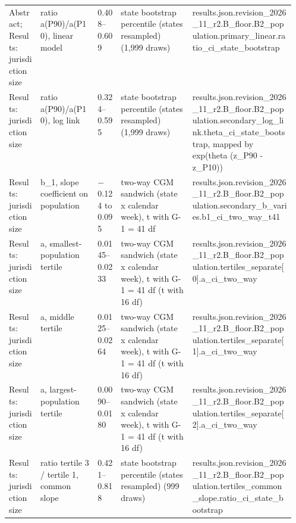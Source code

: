 \begin{table}[!tbp]
\begin{tabularx}{\linewidth}{@{}p{0.11\linewidth}p{0.2\linewidth}lp{0.25\linewidth}X@{}}
Abstract; Results: jurisdiction size & ratio a(P90)/a(P10), linear model & 0.408--0.609 & state bootstrap percentile (states resampled) (1,999 draws) & {\ttfamily\tiny results.\allowbreak{}json.\allowbreak{}revision\_2026\_11\_r2.\allowbreak{}B\_floor.\allowbreak{}B2\_population.\allowbreak{}primary\_linear.\allowbreak{}ratio\_ci\_state\_bootstrap} \\
Results: jurisdiction size & ratio a(P90)/a(P10), log link & 0.324--0.595 & state bootstrap percentile (states resampled) (1,999 draws) & {\ttfamily\tiny results.\allowbreak{}json.\allowbreak{}revision\_2026\_11\_r2.\allowbreak{}B\_floor.\allowbreak{}B2\_population.\allowbreak{}secondary\_log\_link.\allowbreak{}theta\_ci\_state\_bootstrap, mapped by exp(theta (z\_P90 - z\_P10))} \\
Results: jurisdiction size & b\_1, slope coefficient on population & $-$0.124 to 0.095 & two-way CGM sandwich (state x calendar week), t with G-1 = 41 df & {\ttfamily\tiny results.\allowbreak{}json.\allowbreak{}revision\_2026\_11\_r2.\allowbreak{}B\_floor.\allowbreak{}B2\_population.\allowbreak{}secondary\_b\_varies.\allowbreak{}b1\_ci\_two\_way\_t41} \\
Results: jurisdiction size & a, smallest-population tertile & 0.0145--0.0233 & two-way CGM sandwich (state x calendar week), t with G-1 = 41 df (t with 16 df) & {\ttfamily\tiny results.\allowbreak{}json.\allowbreak{}revision\_2026\_11\_r2.\allowbreak{}B\_floor.\allowbreak{}B2\_population.\allowbreak{}tertiles\_separate\allowbreak{}[0].\allowbreak{}a\_ci\_two\_way} \\
Results: jurisdiction size & a, middle tertile & 0.0125--0.0264 & two-way CGM sandwich (state x calendar week), t with G-1 = 41 df (t with 16 df) & {\ttfamily\tiny results.\allowbreak{}json.\allowbreak{}revision\_2026\_11\_r2.\allowbreak{}B\_floor.\allowbreak{}B2\_population.\allowbreak{}tertiles\_separate\allowbreak{}[1].\allowbreak{}a\_ci\_two\_way} \\
Results: jurisdiction size & a, largest-population tertile & 0.0090--0.0180 & two-way CGM sandwich (state x calendar week), t with G-1 = 41 df (t with 16 df) & {\ttfamily\tiny results.\allowbreak{}json.\allowbreak{}revision\_2026\_11\_r2.\allowbreak{}B\_floor.\allowbreak{}B2\_population.\allowbreak{}tertiles\_separate\allowbreak{}[2].\allowbreak{}a\_ci\_two\_way} \\
Results: jurisdiction size & ratio tertile 3 / tertile 1, common slope & 0.421--0.818 & state bootstrap percentile (states resampled) (999 draws) & {\ttfamily\tiny results.\allowbreak{}json.\allowbreak{}revision\_2026\_11\_r2.\allowbreak{}B\_floor.\allowbreak{}B2\_population.\allowbreak{}tertiles\_common\_slope.\allowbreak{}ratio\_ci\_state\_bootstrap} \\

\end{tabularx}
\end{table}
